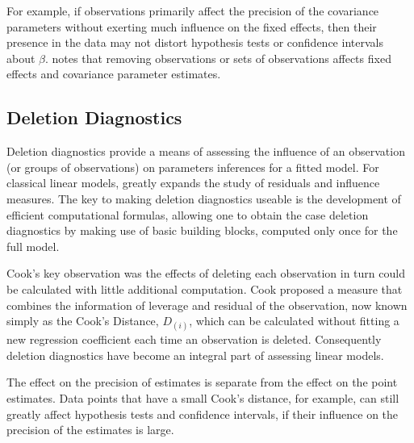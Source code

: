 \documentclass[12pt, a4paper]{report}
\theoremstyle{definition}
\theoremstyle{remark}
\begin{document}
For example, if observations primarily affect the precision of the covariance parameters without exerting much influence on the fixed effects, then their presence in the data may not distort hypothesis
tests or confidence intervals about $\beta$. 
\citet{schabenberger} notes that removing observations or sets of observations affects fixed effects and covariance parameter estimates.





\subsection{Deletion Diagnostics}


Deletion diagnostics provide a means of assessing the influence of an observation (or groups of observations) on parameters inferences for a fitted model. For classical linear models, \citet{cook77} greatly expands the study of residuals and influence measures. The key to making deletion diagnostics useable is the development of efficient computational formulas, allowing one to obtain the  case deletion diagnostics by making use of basic building blocks, computed only once for the full model.


Cook's key observation was the effects of deleting each observation in turn could be calculated with little additional computation. Cook proposed a measure that combines the information of leverage and residual of the observation, now known simply as the Cook's Distance, $D_{(i)}$, which can be calculated without fitting a new regression coefficient each time an observation is deleted. Consequently deletion diagnostics have become an integral part of assessing linear models.

The effect on the precision of estimates is separate from the effect on the point estimates. Data points that have a small Cook's distance, for example, can still greatly affect hypothesis tests and confidence intervals, if their influence on the precision of the estimates is large.
\end{document}
